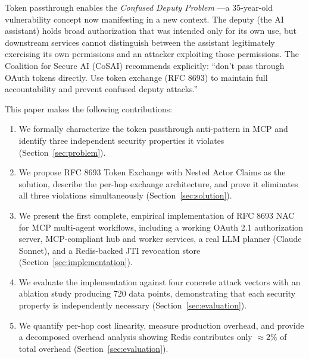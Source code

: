 \documentclass[journal]{IEEEtran}
\begin{document}
Token passthrough enables the \textit{Confused Deputy Problem} \cite{hardy1988}—a 35-year-old vulnerability concept now manifesting in a new context. The deputy (the AI assistant) holds broad authorization that was intended only for its own use, but downstream services cannot distinguish between the assistant legitimately exercising its own permissions and an attacker exploiting those permissions. The Coalition for Secure AI (CoSAI) \cite{cosai_mcp} recommends explicitly: ``don't pass through OAuth tokens directly. Use token exchange (RFC 8693) to maintain full accountability and prevent confused deputy attacks.''

This paper makes the following contributions:

\begin{enumerate}
  \item We formally characterize the token passthrough anti-pattern in MCP and identify three independent security properties it violates (Section~\ref{sec:problem}).
  \item We propose RFC 8693 Token Exchange with Nested Actor Claims as the solution, describe the per-hop exchange architecture, and prove it eliminates all three violations simultaneously (Section~\ref{sec:solution}).
  \item We present the first complete, empirical implementation of RFC 8693 NAC for MCP multi-agent workflows, including a working OAuth 2.1 authorization server, MCP-compliant hub and worker services, a real LLM planner (Claude Sonnet), and a Redis-backed JTI revocation store (Section~\ref{sec:implementation}).
  \item We evaluate the implementation against four concrete attack vectors with an ablation study producing 720 data points, demonstrating that each security property is independently necessary (Section~\ref{sec:evaluation}).
  \item We quantify per-hop cost linearity, measure production overhead, and provide a decomposed overhead analysis showing Redis contributes only $\approx 2\%$ of total overhead (Section~\ref{sec:evaluation}).
\end{enumerate}

\end{document}
